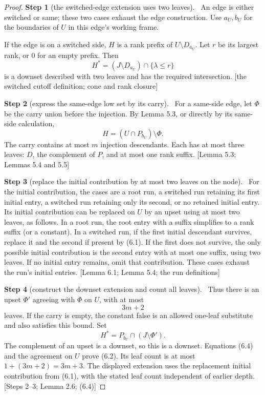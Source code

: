 \documentclass[11pt,a4paper]{article}
\theoremstyle{plain}
\theoremstyle{definition}
\newcommand{\step}[2]{\par\smallskip\noindent\textbf{Step #1} (#2).\ \ignorespaces}
\newcommand{\by}[1]{{\small[#1]}}
\begin{document}
\begin{proof}
\step{1}{the switched-edge extension uses two leaves}
An edge is either switched or same; these two cases exhaust the edge construction. Use \(a_U,b_U\) for the boundaries of \(U\) in this edge's working frame.

If the edge is on a switched side, \(H\) is a rank prefix of \(U\setminus D_{a_U}\). Let \(r\) be its largest rank, or \(0\) for an empty prefix. Then \[
H^*=(J\setminus D_{a_U})\cap\{\lambda\leq r\}
\tag{6.3}
\] is a downset described with two leaves and has the required intersection.
\by{the switched cutoff definition; cone and rank closure}

\step{2}{express the same-edge low set by its carry}
For a same-side edge, let \(\Phi\) be the carry union before the injection. By Lemma 5.3, or directly by its same-side calculation, \[
H=(U\cap P_{b_U})\setminus\Phi.
\tag{6.4}
\] The carry contains at most \(m\) injection descendants. Each has at most three leaves: \(D\), the complement of \(P\), and at most one rank suffix.
\by{Lemma 5.3; Lemmas 5.4 and 5.5}

\step{3}{replace the initial contribution by at most two leaves on the node}
For the initial contribution, the cases are a root run, a switched run retaining its first initial entry, a switched run retaining only its second, or no retained initial entry. Its initial contribution can be replaced on \(U\) by an upset using at most two leaves, as follows. In a root run, the root entry with a suffix simplifies to a rank suffix (or a constant). In a switched run, if the first initial descendant survives, replace it and the second if present by (6.1). If the first does not survive, the only possible initial contribution is the second entry with at most one suffix, using two leaves. If no initial entry remains, omit that contribution. These cases exhaust the run's initial entries.
\by{Lemma 6.1; Lemma 5.4; the run definitions}

\step{4}{construct the downset extension and count all leaves}
Thus there is an upset \(\Phi'\) agreeing with \(\Phi\) on \(U\), with at most \[
3m+2
\tag{6.5}
\] leaves. If the carry is empty, the constant false is an allowed one-leaf substitute and also satisfies this bound. Set \[
H^*=P_{b_U}\cap(J\setminus\Phi').
\tag{6.6}
\] The complement of an upset is a downset, so this is a downset. Equations (6.4) and the agreement on \(U\) prove (6.2). Its leaf count is at most \(1+(3m+2)=3m+3\). The displayed extension uses the replacement initial contribution from (6.1), with the stated leaf count independent of earlier depth.
\by{Steps 2--3; Lemma 2.6; (6.4)}
\end{proof}
\end{document}
